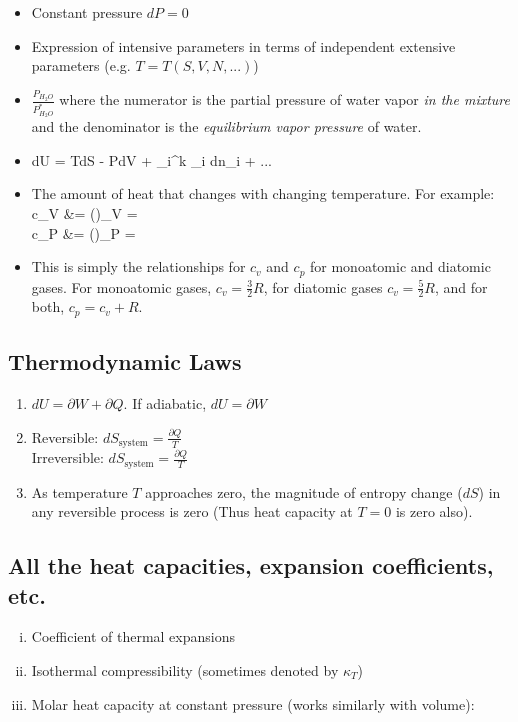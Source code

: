 \documentclass[12pt]{article}
\begin{document}
\begin{itemize}
\item {} Constant pressure $dP = 0$
\item {} Expression of intensive parameters in terms of independent extensive parameters (e.g. $T= T(S,V,N,...)$)
\item {} $\frac{P_{H_2O}}{P_{H_2O}^*}$ where the numerator is the partial pressure of water vapor \emph{in the mixture} and the denominator is the \emph{equilibrium vapor pressure} of water.
\item {}
\eqs
dU = TdS - PdV + \sum_i^k \mu_i dn_i + ...
\eqe
\item {} The amount of heat that changes with changing temperature.  For example:
\eqs
c_V &= \left(\right)_V = \\
c_P &= \left(\right)_P = 
\eqe
\item {} This is simply the relationships for $c_v$ and $c_p$ for monoatomic and diatomic gases.  For monoatomic gases, $c_v = \frac{3}{2} R$, for diatomic gases $c_v = \frac{5}{2} R$, and for both, $c_p = c_v + R$.
\end{itemize}


\subsection{Thermodynamic Laws}
\begin{enumerate}[(1)]
\item $dU = \partial W + \partial Q$.  If adiabatic, $dU = \partial W$
\item Reversible: $dS_\text{system} = \frac{\partial Q}{T}$\\
Irreversible: $dS_\text{system} = \frac{\partial Q}{T}$
\item As temperature $T$ approaches zero, the magnitude of entropy change ($dS$) in any reversible process is zero (Thus heat capacity at $T=0$ is zero also).
\end{enumerate}



\subsection{All the heat capacities, expansion coefficients, etc.}
\begin{enumerate}[(i)]
\item Coefficient of thermal expansions
\eqs
{}
\eqe
\item Isothermal compressibility (sometimes denoted by $\kappa_T$)
\eqs
{}
\eqe
\item Molar heat capacity at constant pressure (works similarly with volume):
\eqs
{}
\eqe
\end{enumerate}
\end{document}
